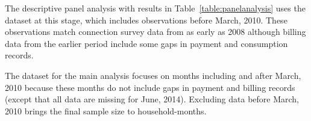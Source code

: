 \documentclass[12pt,table]{article}
\begin{document}
The descriptive panel analysis with results in Table~\ref{table:panelanalysis} uses the dataset at this stage, which includes observations before March, 2010.  These observations match connection survey data from as early as 2008 although billing data from the earlier period include some gaps in payment and consumption records.

The dataset for the main analysis focuses on months including and after March, 2010 because these months do not include gaps in payment and billing records (except that all data are missing for June, 2014).  Excluding data before March, 2010 brings the final sample size to household-months.



\begin{table}[H]
\centering
\caption{Sample Construction}\label{table:sampleconstruction}
\vspace{-2mm}
\end{table}
\end{document}
